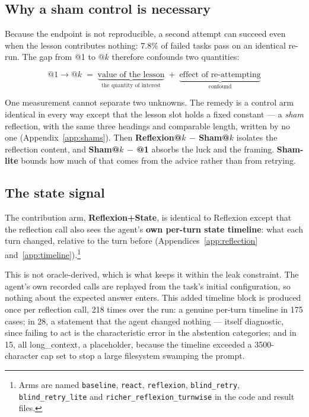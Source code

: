 \documentclass[a4paper, 12pt]{article}
\begin{document}
\subsection{Why a sham control is necessary}

Because the endpoint is not reproducible, a second attempt can succeed even
when the lesson contributes nothing: 7.8\% of failed tasks pass on an identical
re-run. The gap from @1 to @$k$ therefore confounds two quantities:

\[
\text{@1}\rightarrow\text{@}k \;=\; \underbrace{\text{value of the lesson}}_{\text{the quantity of interest}} \;+\; \underbrace{\text{effect of re-attempting}}_{\text{confound}}
\]

One measurement cannot separate two unknowns. The remedy is a control arm identical in every way except
that the lesson slot holds a fixed constant --- a \emph{sham} reflection, with
the same three headings and comparable length, written by no one
(Appendix~\ref{app:shams}). Then
\textbf{Reflexion@$k$ $-$ Sham@$k$} isolates the reflection content, and
\textbf{Sham@$k$ $-$ @1} absorbs the luck and the framing.
\textbf{Sham-lite} bounds how much of that comes from the advice rather than from retrying.

\subsection{The state signal}

The contribution arm, \textbf{Reflexion+State}, is identical to Reflexion except
that the reflection call also sees the agent's \textbf{own per-turn state
timeline}: what each turn changed, relative to the turn before
(Appendices~\ref{app:reflection} and~\ref{app:timeline}).\footnote{Arms are
named \texttt{baseline}, \texttt{react}, \texttt{reflexion},
\texttt{blind\_retry}, \texttt{blind\_retry\_lite} and
\texttt{richer\_reflexion\_turnwise} in the code and result files.}

This is not oracle-derived, which is what keeps it within the leak constraint.
The agent's own recorded calls are replayed from the task's initial
configuration, so nothing about the expected answer enters. This added timeline block is produced
once per reflection call, 218 times over the run: a genuine per-turn timeline in 175 cases; in 28,
a statement that the agent changed nothing --- itself diagnostic, since failing to act
is the characteristic error in the abstention categories; and in 15, all long\_context,
a placeholder, because the timeline exceeded a 3500-character cap set to stop a large filesystem swamping the prompt.
\end{document}
